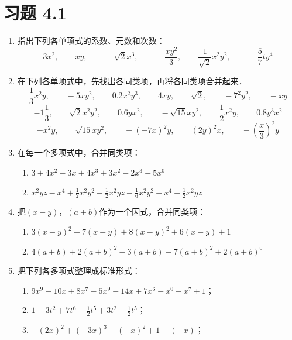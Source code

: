 \section*{习题 4.1}
\begin{enumerate}
    \item 指出下列各单项式的系数、元数和次数：
    \[3x^2,\qquad xy,\qquad -\sqrt{2}x^3,\qquad -\frac{xy^2}{3},\qquad \frac{1}{\sqrt{2}}x^2y^2,\qquad -\frac{5}{7}ty^4 \]
\item  在下列各单项式中，先找出各同类项，再将各同类项合并起来．
\[\frac{1}{3}x^2y,\qquad  -5xy^2,\qquad 0.2x^2y^3,\qquad  4xy,\qquad \sqrt{2},\qquad  -7^2y^2,\qquad  -xy\]
\[-1\frac{1}{3},\qquad  \sqrt{2}x^2y^2,\qquad  0.6yx^2,\qquad  -\sqrt{15}xy^2,\qquad  \frac{1}{2}x^2y,\qquad  0.8y^3x^2\]
\[-x^2y,\qquad \sqrt{15}xy^2,\qquad  -(-7x)^2 y,\qquad  (2y)^2x,\qquad -\left(\frac{x}{3}\right)^2y\]
\item  在每一个多项式中，合并同类项：
\begin{enumerate}
    \item $3+4x^2-3x+4x^3+3x^2-2x^3-5x^0$
    \item $x^2yz-x^4+\frac{1}{2}x^2y^2-\frac{1}{2}x^2yz-\frac{1}{6}x^2y^2+x^4-\frac{1}{2}x^2yz$
\end{enumerate}

\item 把$(x-y)$，$(a+b)$作为一个因式，合并同类项：
\begin{enumerate}
    \item $3(x-y)^2-7(x-y)+8(x-y)^2+6(x-y)+1$
    \item $4(a+b)+2(a+b)^2-3(a+b)-7(a+b)^2+2(a+b)^0$
\end{enumerate}

\item 把下列各多项式整理成标准形式：
\begin{enumerate}
    \item $9x^9-10x+8x^7-5x^9-14x+7x^6-x^0-x^7+1$；
    \item $1-3t^2+7t^6-\frac{1}{2}t^5+3t^2+\frac{1}{2}t^5$；
    \item $-(2x)^2+(-3x)^3-(-x)^2+1-(-x)$；
\end{enumerate}


\end{enumerate}
